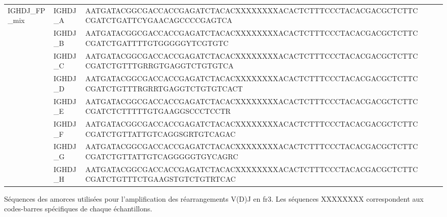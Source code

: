 \begin{annex}[htbp]
{\begin{tabular}{lllp{7cm}rr}
IGHDJ\_FP\_mix & IGHDJ\_A & AATGATACGGCGACCACCGAGATCTACACXXXXXXXXACACTCTTTCCCTACACGACGCTCTTCCGATCTGATTCYGAACAGCCCCGAGTCA \\
& IGHDJ\_B & AATGATACGGCGACCACCGAGATCTACACXXXXXXXXACACTCTTTCCCTACACGACGCTCTTCCGATCTGATTTTGTGGGGGYTCGTGTC \\
& IGHDJ\_C & AATGATACGGCGACCACCGAGATCTACACXXXXXXXXACACTCTTTCCCTACACGACGCTCTTCCGATCTGTTTGRRGTGAGGTCTGTGTCA \\
& IGHDJ\_D & AATGATACGGCGACCACCGAGATCTACACXXXXXXXXACACTCTTTCCCTACACGACGCTCTTCCGATCTGTTTRGRRTGAGGTCTGTGTCACT \\
& IGHDJ\_E & AATGATACGGCGACCACCGAGATCTACACXXXXXXXXACACTCTTTCCCTACACGACGCTCTTCCGATCTCTTTTTGTGAAGGSCCCTCCTR \\
& IGHDJ\_F & AATGATACGGCGACCACCGAGATCTACACXXXXXXXXACACTCTTTCCCTACACGACGCTCTTCCGATCTGTTATTGTCAGGSGRTGTCAGAC \\
& IGHDJ\_G & AATGATACGGCGACCACCGAGATCTACACXXXXXXXXACACTCTTTCCCTACACGACGCTCTTCCGATCTGTTATTGTCAGGGGGTGYCAGRC \\
& IGHDJ\_H & AATGATACGGCGACCACCGAGATCTACACXXXXXXXXACACTCTTTCCCTACACGACGCTCTTCCGATCTGTTTCTGAAGSTGTCTGTRTCAC \\

\hline
\end{tabular}
}
\caption{
    Séquences des amorces utilisées pour l'amplification des réarrangements V(D)J en \gls{fr}3.
    Les séquences XXXXXXXX correspondent aux codes-barres spécifiques de chaque échantillons.
    }
\label{anx:primer-sequences}
\end{annex}